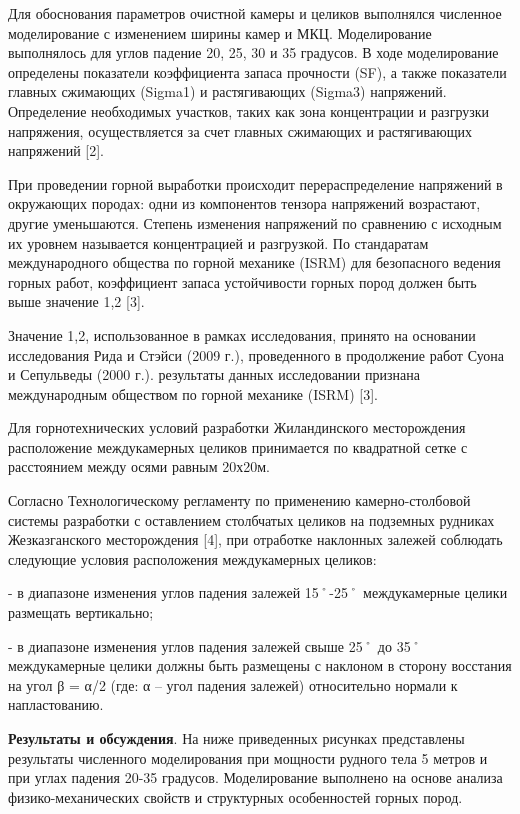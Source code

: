 Для обоснования параметров очистной камеры и целиков выполнялся
численное моделирование с изменением ширины камер и МКЦ. Моделирование
выполнялось для углов падение 20, 25, 30 и 35 градусов. В ходе
моделирование определены показатели коэффициента запаса прочности (SF),
а также показатели главных сжимающих (Sigma1) и растягивающих (Sigma3)
напряжений. Определение необходимых участков, таких как зона
концентрации и разгрузки напряжения, осуществляется за счет главных
сжимающих и растягивающих напряжений {[}2{]}.

При проведении горной выработки происходит перераспределение напряжений
в окружающих породах: одни из компонентов тензора напряжений возрастают,
другие уменьшаются. Степень изменения напряжений по сравнению с исходным
их уровнем называется концентрацией и разгрузкой. По стандаратам
международного общества по горной механике (ISRM) для безопасного
ведения горных работ, коэффициент запаса устойчивости горных пород
должен быть выше значение 1,2 {[}3{]}.

Значение 1,2, использованное в рамках исследования, принято на основании
исследования Рида и Стэйси (2009 г.), проведенного в продолжение работ
Суона и Сепульведы (2000 г.). результаты данных исследовании признана
международным обществом по горной механике (ISRM) {[}3{]}.

Для горнотехнических условий разработки Жиландинского месторождения
расположение междукамерных целиков принимается по квадратной сетке с
расстоянием между осями равным 20х20м.

Согласно Технологическому регламенту по применению камерно-столбовой
системы разработки с оставлением столбчатых целиков на подземных
рудниках Жезказганского месторождения {[}4{]}, при отработке наклонных
залежей соблюдать следующие условия расположения междукамерных целиков:

- в диапазоне изменения углов падения залежей 15˚-25˚ междукамерные
целики размещать вертикально;

- в диапазоне изменения углов падения залежей свыше 25˚ до 35˚
междукамерные целики должны быть размещены с наклоном в сторону
восстания на угол β = α/2 (где: α -- угол падения залежей) относительно
нормали к напластованию.

{\bfseries Результаты и обсуждения}. На ниже приведенных рисунках
представлены результаты численного моделирования при мощности рудного
тела 5 метров и при углах падения 20-35 градусов. Моделирование
выполнено на основе анализа физико-механических свойств и структурных
особенностей горных пород.

